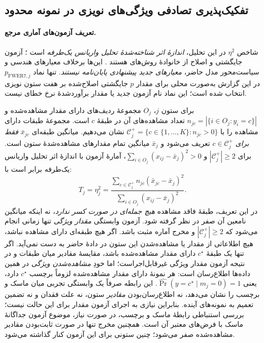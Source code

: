 \subsection{تفکیک‌پذیری تصادفی ویژگی‌های نویزی در نمونه محدود}

\paragraph{تعریف آزمون‌های آماری مرجع.}
شاخص $\eta^2$ در این تحلیل،
\emph{اندازهٔ اثر شناخته‌شدهٔ
تحلیل واریانس یک‌طرفه}
است \cite{Richardson2011EtaSquared}؛
آزمون جایگشتی و اصلاح
از خانوادهٔ روش‌های
هستند
\cite{WestfallYoung1993Resampling}.
این‌ها برخلاف معیارهای
هندسی و سیاست‌محور
مدل حاضر،
\emph{معیارهای جدید پیشنهادی
پایان‌نامه نیستند}.
تنها نماد
$p_{\mathrm{FWER7},j}$
در این گزارش به‌صورت
محلی برای مقدار
$p$ جایگشتی اصلاح‌شده
بر هفت ستون نویزی
انتخاب شده است؛
این نماد نام آزمون
جدید یا مقدار برآوردشدهٔ
نرخ خطای  نیست.

برای ستون $j$،
$O_j$ مجموعهٔ ردیف‌های
دارای مقدار مشاهده‌شده و
$n_{jc}=|\{i\in O_j:y_i=c\}|$
تعداد مشاهده‌های آن در طبقهٔ $c$ است.
مجموعهٔ طبقات دارای مشاهده را با
$\mathcal C_j^+=\{c\in\{1,\ldots,K\}:n_{jc}>0\}$
نشان می‌دهیم.
میانگین طبقه‌ای $\bar x_{jc}$
\emph{فقط برای} $c\in\mathcal C_j^+$
تعریف می‌شود و $\bar x_j$
میانگین تمام مقدارهای مشاهده‌شدهٔ
ستون است. برای
$|\mathcal C_j^+|\ge2$ و
$\sum_{i\in O_j}(x_{ij}-\bar x_j)^2>0$،
آمارهٔ آزمون با اندازهٔ اثر
تحلیل واریانس یک‌طرفه برابر است با:
\begin{equation}
\label{cmp:eq:ch4-e14-eta2}
T_j=\eta_j^2=
\frac{\displaystyle\sum_{c\in\mathcal C_j^+}
n_{jc}(\bar x_{jc}-\bar x_j)^2}
{\displaystyle\sum_{i\in O_j}
(x_{ij}-\bar x_j)^2}.
\end{equation}
در این تعریف، طبقهٔ فاقد مشاهده
\emph{هیچ جمله‌ای در صورت کسر ندارد}،
نه اینکه میانگین نامعین آن صفر در نظر گرفته شود.
آزمون وابستگی \emph{مقدار ویژگی}
تنها زمانی انجام می‌شود که
$|\mathcal C_j^+|\ge2$ و مخرج آماره مثبت باشد.
اگر هیچ طبقه‌ای دارای مشاهده نباشد،
هیچ اطلاعاتی از مقدار یا مشاهده‌شدن
این ستون در دادهٔ حاضر به دست نمی‌آید.
اگر تنها یک طبقهٔ $c^\star$ دارای
مقدار مشاهده‌شده باشد، مقایسهٔ
مقادیر میان طبقات و در نتیجه
آزمون مقدار ویژگی غیرقابل‌اجراست؛
اما خودِ \emph{مشاهده‌شدن ویژگی}
در همین داده‌ها اطلاع‌رسان است:
هر نمونهٔ دارای مقدار مشاهده‌شده
لزوماً برچسب $c^\star$ دارد، یعنی
$\widehat{\Pr}(y=c^\star\mid m_j=0)=1$.
این رابطه صرفاً یک وابستگی تجربی
میان ماسک و برچسب را نشان می‌دهد،
نه اطلاع‌رسان‌بودن \emph{مقادیر} ستون،
نه علت فقدان و نه تضمین تعمیم به
نمونه‌های آینده. بنابراین نیازی به
اجرای آزمون مقدار برای این حالت نیست؛
بررسی استنباطی رابطهٔ ماسک و برچسب،
در صورت نیاز، موضوع آزمون جداگانهٔ
ماسک با فرض‌های معتبر آن است.
همچنین مخرج تنها در صورت ثابت‌بودن
مقادیر مشاهده‌شده صفر می‌شود؛
چنین ستونی برای این آزمون کنار گذاشته می‌شود.

